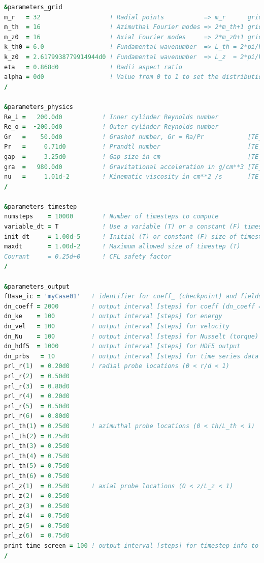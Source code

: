 \documentclass[a4paper, 11pt, DIV=11]{scrartcl}
\begin{document}
\begin{lstlisting}[language=fortran]
&parameters_grid
m_r   = 32                   ! Radial points           => m_r      grid points
m_th  = 16                   ! Azimuthal Fourier modes => 2*m_th+1 grid points
m_z0  = 16                   ! Axial Fourier modes     => 2*m_z0+1 grid points
k_th0 = 6.0                  ! Fundamental wavenumber  => L_th = 2*pi/k_th0
k_z0  = 2.6179938779914944d0 ! Fundamental wavenumber  => L_z  = 2*pi/k_z0
eta   = 0.868d0              ! Radii aspect ratio
alpha = 0d0                  ! Value from 0 to 1 to set the distribution of radial nodes => 0 (Chebyshev) ----- 1 (uniform)
/

&parameters_physics
Re_i =   200.0d0           ! Inner cylinder Reynolds number
Re_o =  -200.0d0           ! Outer cylinder Reynolds number
Gr   =    50.0d0           ! Grashof number, Gr = Ra/Pr            [TE_CODE only]
Pr   =     0.71d0          ! Prandtl number                        [TE_CODE only]
gap  =     3.25d0          ! Gap size in cm                        [TE_CODE only]
gra  =   980.0d0           ! Gravitational acceleration in g/cm**3 [TE_CODE only]
nu   =     1.01d-2         ! Kinematic viscosity in cm**2 /s       [TE_CODE only]
/

&parameters_timestep
numsteps    = 10000        ! Number of timesteps to compute
variable_dt = T            ! Use a variable (T) or a constant (F) timestep size
init_dt     = 1.00d-5      ! Initial (T) or constant (F) size of timestep
maxdt       = 1.00d-2      ! Maximum allowed size of timestep (T)
Courant     = 0.25d+0      ! CFL safety factor
/

&parameters_output
fBase_ic = 'myCase01'   ! identifier for coeff_ (checkpoint) and fields_ (hdf5) files
dn_coeff = 2000         ! output interval [steps] for coeff (dn_coeff = -1 disables ouput)
dn_ke    = 100          ! output interval [steps] for energy
dn_vel   = 100          ! output interval [steps] for velocity
dn_Nu    = 100          ! output interval [steps] for Nusselt (torque)
dn_hdf5  = 1000         ! output interval [steps] for HDF5 output
dn_prbs   = 10          ! output interval [steps] for time series data at probe locations
prl_r(1)  = 0.20d0      ! radial probe locations (0 < r/d < 1)
prl_r(2)  = 0.50d0
prl_r(3)  = 0.80d0
prl_r(4)  = 0.20d0
prl_r(5)  = 0.50d0
prl_r(6)  = 0.80d0
prl_th(1) = 0.25d0      ! azimuthal probe locations (0 < th/L_th < 1)
prl_th(2) = 0.25d0
prl_th(3) = 0.25d0
prl_th(4) = 0.75d0
prl_th(5) = 0.75d0
prl_th(6) = 0.75d0
prl_z(1)  = 0.25d0      ! axial probe locations (0 < z/L_z < 1)
prl_z(2)  = 0.25d0
prl_z(3)  = 0.25d0
prl_z(4)  = 0.75d0
prl_z(5)  = 0.75d0
prl_z(6)  = 0.75d0
print_time_screen = 100 ! output interval [steps] for timestep info to stdout
/


\end{lstlisting}
\end{document}
